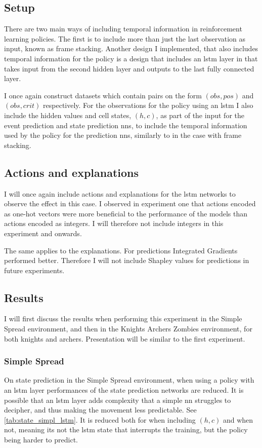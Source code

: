 \documentclass[UKenglish]{uiomasterthesis}
\begin{document}
\subsection{Setup}
There are two main ways of including temporal information in reinforcement learning policies. The first is to include more than just the last observation as input, known as frame stacking. Another design I implemented, that also includes temporal information for the policy is a design that includes an \ac{lstm} layer in that takes input from the second hidden layer and outputs to the last fully connected layer.

I once again construct datasets which contain pairs on the form $(obs, pos)$ and $(obs, crit)$ respectively. For the observations for the policy using an \ac{lstm} I also include the hidden values and cell states, $(h,c)$, as part of the input for the event prediction and state prediction \acp{nn}, to include the temporal information used by the policy for the prediction \acp{nn}, similarly to in the case with frame stacking.

\subsection{Actions and explanations}
I will once again include actions and explanations for the \ac{lstm} networks to observe the effect in this case. I observed in experiment one that actions encoded as one-hot vectors were more beneficial to the performance of the models than actions encoded as integers. I will therefore not include integers in this experiment and onwards.

The same applies to the explanations. For predictions Integrated Gradients performed better. Therefore I will not include Shapley values for predictions in future experiments.

\subsection{Results}
I will first discuss the results when performing this experiment in the Simple Spread environment, and then in the Knights Archers Zombies environment, for both knights and archers. Presentation will be similar to the first experiment.

\subsubsection{Simple Spread}

On state prediction in the Simple Spread environment, when using a policy with an \ac{lstm} layer performances of the state prediction networks are reduced. It is possible that an \ac{lstm} layer adds complexity that a simple \ac{nn} struggles to decipher, and thus making the movement less predictable. See \cref{tab:state_simpl_lstm}. It is reduced both for when including $(h, c)$ and when not, meaning its not the \ac{lstm} state that interrupts the training, but the policy being harder to predict.
\end{document}
